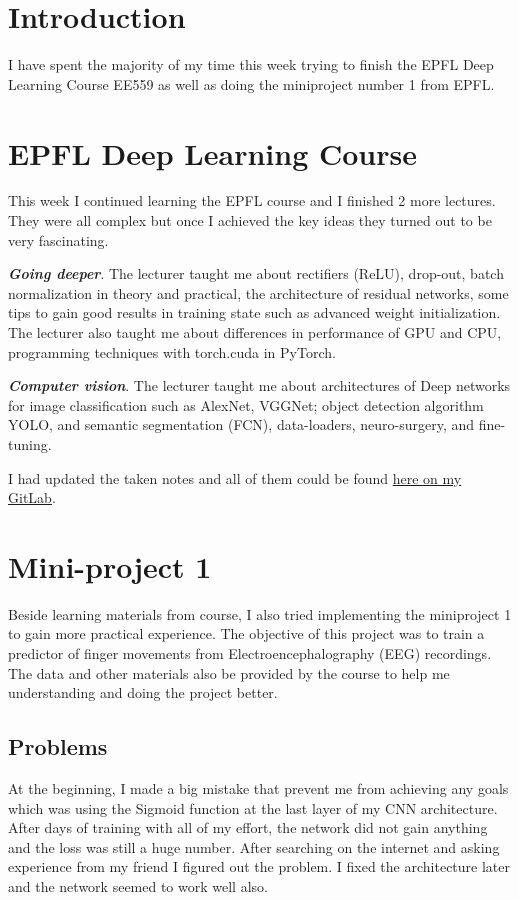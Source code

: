 \section{Introduction}
I have spent the majority of my time this week trying to finish the EPFL Deep Learning Course EE559 as well as doing the miniproject number 1 from EPFL\cite{miniproject1}.

\section{EPFL Deep Learning Course}
This week I continued learning the EPFL course and I finished 2 more lectures. They were all complex but once I achieved the key ideas they turned out to be very fascinating.

\textbf{\emph{Going deeper}}. The lecturer taught me about rectifiers (ReLU), drop-out, batch normalization in theory and practical, the architecture of residual networks, some tips to gain good results in training state such as advanced weight initialization. The lecturer also taught me about differences in performance of GPU and CPU, programming techniques with torch.cuda in PyTorch.

\textbf{\emph{Computer vision}}. The lecturer taught me about architectures of Deep networks for image classification such as AlexNet, VGGNet\cite{vggnet}; object detection algorithm YOLO\cite{yolo}, and semantic segmentation (FCN)\cite{semanticseg}, data-loaders, neuro-surgery, and fine-tuning.

I had updated the taken notes and all of them could be found \href{https://gitlab.com/tlvu2697/epfl--ee559--deep-learning}{here on my GitLab}.

\section{Mini-project 1}
Beside learning materials from course, I also tried implementing the miniproject 1 to gain more practical experience. The objective of this project was to train a predictor of finger movements from Electroencephalography (EEG) recordings\cite{eegrecord}. The data and other materials also be provided by the course to help me understanding and doing the project better.

\subsection{Problems}
At the beginning, I made a big mistake that prevent me from achieving any goals which was using the Sigmoid function at the last layer of my CNN architecture. After days of training with all of my effort, the network did not gain anything and the loss was still a huge number. After searching on the internet and asking experience from my friend I figured out the problem. I fixed the architecture later and the network seemed to work well also.

